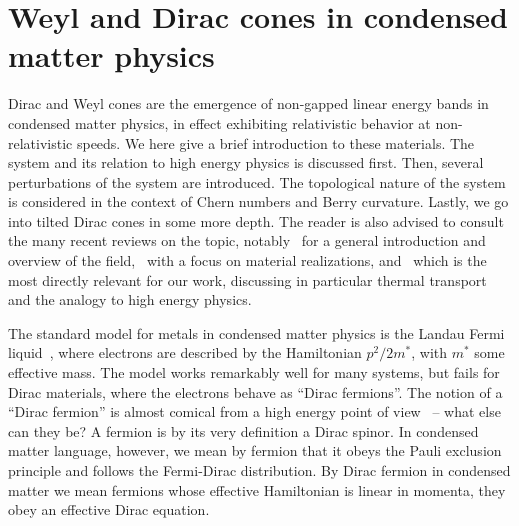 \section[Weyl and Dirac cones]{Weyl and Dirac cones in condensed matter physics}
\label{sec:weyl-dirac-cones}
Dirac and Weyl cones are the emergence of non-gapped linear energy bands in condensed matter physics, in effect exhibiting relativistic behavior at non-relativistic speeds.
We here give a brief introduction to these materials.
The system and its relation to high energy physics is discussed first.
Then, several perturbations of the system are introduced.
The topological nature of the system is considered in the context of Chern numbers and Berry curvature.
Lastly, we go into tilted Dirac cones in some more depth.
The reader is also advised to consult the many recent reviews on the topic, notably~\textcite{armitageWeylDiracSemimetals2018} for a general introduction and overview of the field,~\textcite{jiaWeylSemimetalsFermi2016} with a focus on material realizations, and~\textcite{chernodubThermalTransportGeometry2021} which is the most directly relevant for our work, discussing in particular thermal transport and the analogy to high energy physics.


The standard model for metals in condensed matter physics is the Landau Fermi liquid~\cites{landauTheoryFermiLiquid1956,chernodubThermalTransportGeometry2021}, where electrons are described by the Hamiltonian \( p^2 /2 m^* \), with \( m^* \) some effective mass.
The model works remarkably well for many systems, but fails for Dirac materials, where the electrons behave as ``Dirac fermions''.
The notion of a ``Dirac fermion'' is almost comical from a high energy point of view~\cites{chernodubThermalTransportGeometry2021,vozmedianoTheoreticalPhysicsColloquium2021} -- what else can they be?
A fermion is by its very definition a Dirac spinor.
In condensed matter language, however, we mean by fermion that it obeys the Pauli exclusion principle and follows the Fermi-Dirac distribution.
By Dirac fermion in condensed matter we mean fermions whose effective Hamiltonian is linear in momenta, they obey an effective Dirac equation.

